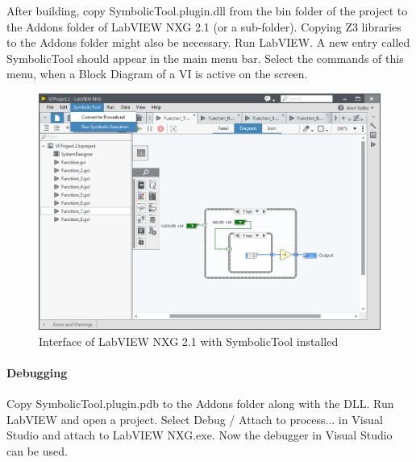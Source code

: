 After building, copy SymbolicTool.plugin.dll from the bin folder of the project to the Addons folder of LabVIEW NXG 2.1 (or a sub-folder). Copying Z3 libraries to the Addons folder might also be necessary. Run LabVIEW. A new entry called SymbolicTool should appear in the main menu bar. Select the commands of this menu, when a Block Diagram of a VI is active on the screen.
\begin{figure}
\centering
\includegraphics[width=150mm,keepaspectratio]{figures/interface.png}
\caption{Interface of LabVIEW NXG 2.1 with SymbolicTool installed} 
\label{fig:interface1}
\end{figure}

\paragraph{Debugging} Copy SymbolicTool.plugin.pdb to the Addons folder along with the DLL. Run LabVIEW and open a project. Select Debug / Attach to process... in Visual Studio and attach to LabVIEW NXG.exe. Now the debugger in Visual Studio can be used.
